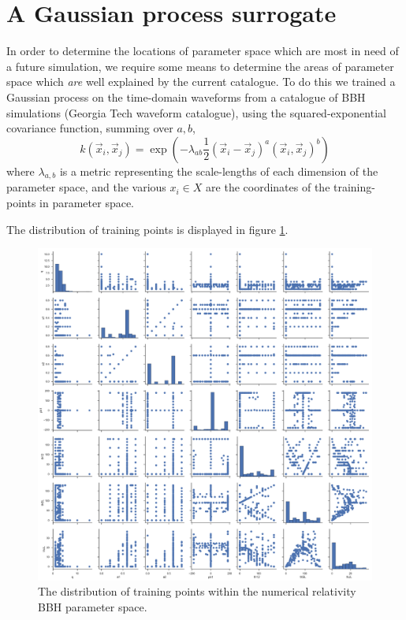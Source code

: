 \documentclass[a4paper]{article}
\begin{document}
\section{A Gaussian process surrogate}
\label{sec:surrogate}

In order to determine the locations of parameter space which are most
in need of a future simulation, we require some means to determine the
areas of parameter space which \emph{are} well explained by the
current catalogue. To do this we trained a Gaussian process on the
time-domain waveforms from a catalogue of BBH simulations (Georgia
Tech waveform catalogue), using the squared-exponential covariance
function, summing over $a, b$, 
\begin{equation}
  \label{eq:squaredexp}
  k(\vec{x}_i, \vec{x}_j) = \exp( - \lambda_{ab} \frac{1}{2} (\vec{x}_i - \vec{x}_j)^a (\vec{x}_i, \vec{x}_j)^b )
\end{equation}
where $\lambda_{a,b}$ is a metric representing the scale-lengths of
each dimension of the parameter space, and the various $x_i \in X$ are the
coordinates of the training-points in parameter space.

The distribution of training points is displayed in figure \ref{fig:parameterspace}.

\begin{figure}
  \centering
  \includegraphics[width=\textwidth]{parameters.pdf}
  \caption{The distribution of training points within the numerical relativity BBH parameter space.}
  \label{fig:parameterspace}
\end{figure}
\end{document}

